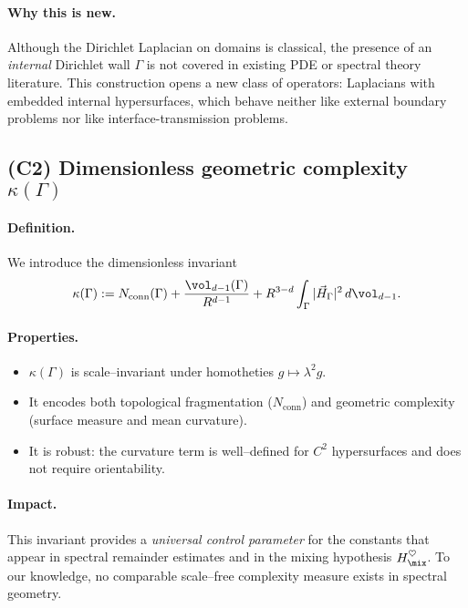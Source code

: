 \paragraph{Why this is new.}
Although the Dirichlet Laplacian on domains is classical, the presence of an \emph{internal} Dirichlet wall $\Gamma$ 
is not covered in existing PDE or spectral theory literature. 
This construction opens a new class of operators: Laplacians with embedded internal hypersurfaces, 
which behave neither like external boundary problems nor like interface-transmission problems.

\subsection{(C2) Dimensionless geometric complexity $\kappa(\Gamma)$}

\paragraph{Definition.}
We introduce the dimensionless invariant
\[
\kappa(\Gamma) := N_{\mathrm{conn}}(\Gamma)
+ \frac{\vol_{d-1}(\Gamma)}{R^{d-1}}
+ R^{3-d}\int_\Gamma |\vec H_\Gamma|^2\, d\vol_{d-1}.
\]

\paragraph{Properties.}
\begin{itemize}
  \item $\kappa(\Gamma)$ is scale–invariant under homotheties $g\mapsto \lambda^2 g$.
  \item It encodes both topological fragmentation ($N_{\mathrm{conn}}$) 
        and geometric complexity (surface measure and mean curvature).
  \item It is robust: the curvature term is well–defined for $C^2$ hypersurfaces 
        and does not require orientability.
\end{itemize}

\paragraph{Impact.}
This invariant provides a \emph{universal control parameter} for the constants 
that appear in spectral remainder estimates and in the mixing hypothesis $H_{\mix}^\heartsuit$. 
To our knowledge, no comparable scale–free complexity measure exists in spectral geometry.


